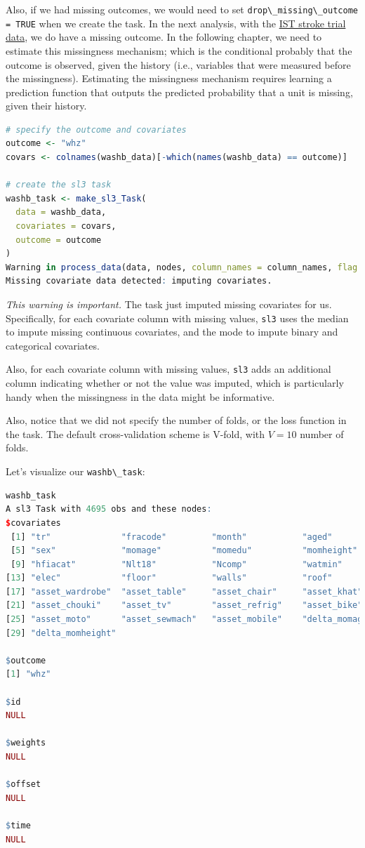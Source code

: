 \documentclass[
  12pt, krantz2,
]{krantz}
\newcommand{\passthrough}[1]{#1}
\newcommand{\1}{\mathbbm{1}}
\theoremstyle{definition}
\theoremstyle{definition}
\theoremstyle{definition}
\theoremstyle{definition}
\theoremstyle{remark}
\begin{document}
Also, if we had missing outcomes, we would need to set \passthrough{\lstinline!drop\_missing\_outcome = TRUE!} when we create the task. In the next analysis, with the \protect\hyperlink{ist}{IST stroke trial
data}, we do have a missing outcome. In the following chapter, we need to
estimate this missingness mechanism; which is the conditional probably that
the outcome is observed, given the history (i.e., variables that were measured
before the missingness). Estimating the missingness mechanism requires learning
a prediction function that outputs the predicted probability that a unit
is missing, given their history.

\begin{lstlisting}[language=R]
# specify the outcome and covariates
outcome <- "whz"
covars <- colnames(washb_data)[-which(names(washb_data) == outcome)]

# create the sl3 task
washb_task <- make_sl3_Task(
  data = washb_data,
  covariates = covars,
  outcome = outcome
)
Warning in process_data(data, nodes, column_names = column_names, flag = flag, :
Missing covariate data detected: imputing covariates.
\end{lstlisting}

\emph{This warning is important.} The task just imputed missing covariates for us.
Specifically, for each covariate column with missing values, \passthrough{\lstinline!sl3!} uses the
median to impute missing continuous covariates, and the mode to impute binary
and categorical covariates.

Also, for each covariate column with missing values, \passthrough{\lstinline!sl3!} adds an additional
column indicating whether or not the value was imputed, which is particularly
handy when the missingness in the data might be informative.

Also, notice that we did not specify the number of folds, or the loss function
in the task. The default cross-validation scheme is V-fold, with \(V=10\) number
of folds.

Let's visualize our \passthrough{\lstinline!washb\_task!}:

\begin{lstlisting}[language=R]
washb_task
A sl3 Task with 4695 obs and these nodes:
$covariates
 [1] "tr"              "fracode"         "month"           "aged"           
 [5] "sex"             "momage"          "momedu"          "momheight"      
 [9] "hfiacat"         "Nlt18"           "Ncomp"           "watmin"         
[13] "elec"            "floor"           "walls"           "roof"           
[17] "asset_wardrobe"  "asset_table"     "asset_chair"     "asset_khat"     
[21] "asset_chouki"    "asset_tv"        "asset_refrig"    "asset_bike"     
[25] "asset_moto"      "asset_sewmach"   "asset_mobile"    "delta_momage"   
[29] "delta_momheight"

$outcome
[1] "whz"

$id
NULL

$weights
NULL

$offset
NULL

$time
NULL
\end{lstlisting}
\end{document}
